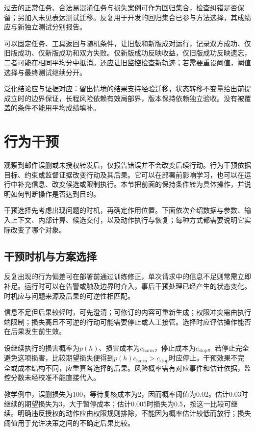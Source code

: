 过去的正常任务、合法易混淆任务与损失案例可作为回归集合，检查纠错是否保留；另加入未见表达测试迁移。反复用于开发的回归集合已参与方法选择，其成绩应与新独立测试分别报告。

可以固定任务、工具返回与随机条件，让旧版和新版成对运行，记录双方成功、仅旧版成功、仅新版成功和双方失败。仅新版成功反映收益，仅旧版成功反映遗忘，二者可能在相同平均分中抵消。还应让旧监控检查新轨迹；若需要重设阈值，阈值选择与最终测试继续分开。

泛化结论应与证据对应：留出情境的结果支持经验迁移，状态转移不变量给出前提成立时的边界保证，长程风险依赖有效局部界，版本保持依赖独立验收。没有被覆盖的条件不能用平均成绩填补。

\section{行为干预}
\label{sec:alignment-intervention}

观察到邮件误删或未授权转发后，仅报告错误并不会改变后续行动。行为干预依据目标、约束或监督证据改变行动及其后果。它可以在部署前影响学习，也可以在运行中补充信息、改变候选或限制执行。本节把前面的保持条件转为具体操作，并说明如何判断操作是否达到目的。

干预选择先考虑出现问题的时机，再确定作用位置。下面依次介绍数据与参数、输入上下文、内部计算、候选交付，以及动作执行与恢复；每种方式都需要说明它实际改变了哪个对象。

\subsection{干预时机与方案选择}
\label{sec:alignment-intervention-decision}

反复出现的行为偏差可在部署前通过训练修正，单次请求中的信息不足则常需立即补足。运行时可以在告警或触及边界时介入，事后干预处理已经产生的状态变化。时机应与问题来源及后果的可逆性相匹配。

信息不足但后果较轻时，可先澄清；可修订的内容可重新生成；权限冲突需由执行端限制；损失高且不可逆的行动可能需要停止或人工接管。选择时应评估操作能否在后果发生前生效。

设继续执行的损害概率为$p(h)$、损害成本为$c_{\mathrm{harm}}$，停止成本为$c_{\mathrm{stop}}$。若停止完全避免这项损害，比较期望损失便得到$p(h)c_{\mathrm{harm}}>c_{\mathrm{stop}}$时应停止。干预效果不完全或成本结构不同，应重算各选择的后果。风险概率需有对应事件和估计依据，监控分数未经校准不能直接代入。

教学例中，误删损失为100，等待复核成本为2，因而概率阈值为0.02。估计0.03时继续的期望损失为3，大于暂停成本；估计0.005时损失为0.5，按这一比较可继续。明确违反授权的动作应由权限规则排除，不能因为概率估计较低而放行；损失阈值用于允许决策之间的不确定后果比较。

